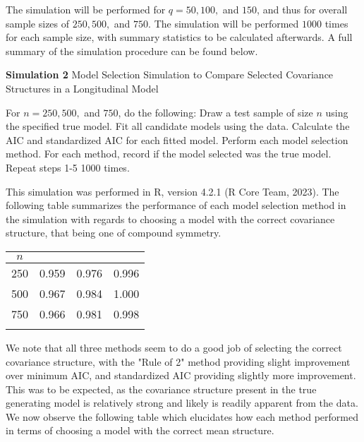 		The simulation will be performed for $q = 50, 100,$ and $150$, and thus for overall sample sizes of $250, 500,$ and $750$. The simulation will be performed $1000$ times for each sample size,
		with summary statistics to be calculated afterwards. A full summary of the simulation procedure can be found below.
		\begin{algorithm}[H]
			\caption*{\textbf{Simulation 2} Model Selection Simulation to Compare Selected Covariance Structures in a Longitudinal Model}
			\begin{algorithmic}[1]
			  \Statex For $n = 250, 500,$ and $750$, do the following:
			  \State Draw a test sample of size $n$ using the specified true model.
			  \State Fit all candidate models using the data.
			  \State Calculate the AIC and standardized AIC for each fitted model.
			  \State Perform each model selection method.
			  \State For each method, record if the model selected was the true model.
			  \State Repeat steps 1-5 1000 times.
			\end{algorithmic}
		\end{algorithm}

		This simulation was performed in R, version 4.2.1 (R Core Team, 2023). The following table summarizes the performance of each model selection method in the simulation with
		regards to choosing a model with the correct covariance structure, that being one of compound symmetry.

		\begin{table}[H]
			\centering
			\small\addtolength{\tabcolsep}{-3pt}
			\setlength\extrarowheight{-3pt}
			{
			\begin{tabular}{ c|c|c|c}
			$n$ & \vtop{\hbox{\strut Minimum AIC}\hbox{\strut Accuracy}} & \vtop{\hbox{\strut AIC Rule of 2}\hbox{\strut Accuracy}} & \vtop{\hbox{\strut Standardized AIC}\hbox{\strut Accuracy}} \\
			 \hline
			 250 & 0.959  &  0.976 &  0.996 \\
			 500 & 0.967  &  0.984 &  1.000 \\
			 750 & 0.966  &  0.981 &  0.998 \\
			 \Xhline{3\arrayrulewidth}
			\end{tabular}
			}
		\end{table}

		We note that all three methods seem to do a good job of selecting the correct covariance structure, with the "Rule of 2" method providing slight improvement over minimum AIC, and
		standardized AIC providing slightly more improvement. This was to be expected, as the covariance structure present in the true generating model is relatively strong and likely
		is readily apparent from the data. We now observe the following table which elucidates how each method performed in terms of choosing a model with the correct mean structure.

